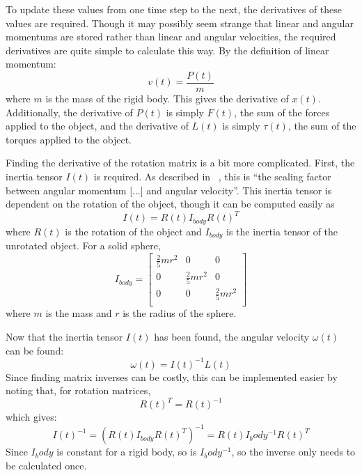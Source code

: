 \documentclass[tog]{acmsiggraph}
\begin{document}
To update these values from one time step to the next, the derivatives of these values are required. Though it may possibly seem strange that linear and angular momentums are stored rather than linear and angular velocities, the required derivatives are quite simple to calculate this way. By the definition of linear momentum:
\begin{equation}
 v(t) = \frac{P(t)}{m}
\end{equation}
where $m$ is the mass of the rigid body. This gives the derivative of $x(t)$. Additionally, the derivative of $P(t)$ is simply $F(t)$, the sum of the forces applied to the object, and the derivative of $L(t)$ is simply $\tau(t)$, the sum of the torques applied to the object.

Finding the derivative of the rotation matrix is a bit more complicated. First, the inertia tensor $I(t)$ is required. As described in ~\cite{pixarnotes}, this is ``the scaling factor between angular momentum [...] and angular velocity''. This inertia tensor is dependent on the rotation of the object, though it can be computed easily as
\begin{equation}
 I(t) = R(t)I_{body}R(t)^{T}
\end{equation}
where $R(t)$ is the rotation of the object and $I_{body}$ is the inertia tensor of the unrotated object. For a solid sphere,
\begin{equation}
 I_{body} =
   \begin{bmatrix}
   	\frac{2}{5}mr^2 & 0 & 0\\
   	0 & \frac{2}{5}mr^2 & 0\\
   	0 & 0 & \frac{2}{5}mr^2\\
   \end{bmatrix}
\end{equation}
where $m$ is the mass and $r$ is the radius of the sphere.

Now that the inertia tensor $I(t)$ has been found, the angular velocity $\omega(t)$ can be found:
\begin{equation}
\omega(t) = I(t)^{-1}L(t)
\end{equation}
Since finding matrix inverses can be costly, this can be implemented easier by noting that, for rotation matrices,
\begin{equation}
R(t)^{T} = R(t)^{-1}
\end{equation}
which gives:
\begin{equation}
I(t)^{-1} = (R(t)I_{body}R(t)^{T})^{-1} = R(t)I_body^{-1}R(t)^{T}
\end{equation}
Since $I_body$ is constant for a rigid body, so is $I_body^{-1}$, so the inverse only needs to be calculated once.
\end{document}
